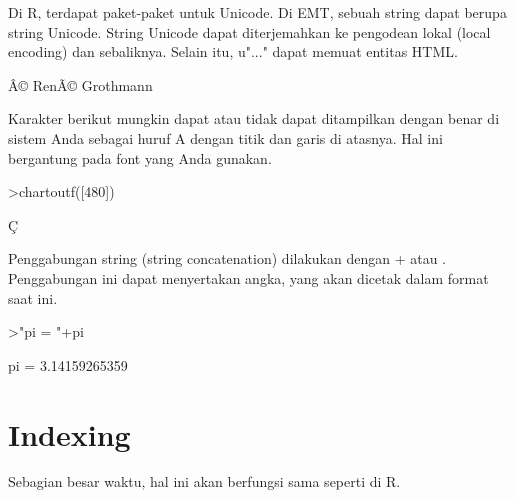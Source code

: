 \documentclass{article}
\newenvironment{eulernotebook}{\par}{\par}
\newcommand{\eulerheading}[1]{\section{#1}}
\newenvironment{eulercomment}{\par\medskip}{\par\medskip}
\begin{document}
\begin{eulernotebook}
\begin{eulercomment}
\begin{eulercomment}
\begin{eulercomment}
\begin{eulercomment}
\begin{eulercomment}
Di R, terdapat paket-paket untuk Unicode. Di EMT, sebuah string dapat
berupa string Unicode. String Unicode dapat diterjemahkan ke pengodean
lokal (local encoding) dan sebaliknya. Selain itu, u"..." dapat memuat
entitas HTML.
\end{eulercomment}
\begin{euleroutput}
  Â© RenÃ© Grothmann
\end{euleroutput}
\begin{eulercomment}
Karakter berikut mungkin dapat atau tidak dapat ditampilkan dengan
benar di sistem Anda sebagai huruf A dengan titik dan garis di
atasnya. Hal ini bergantung pada font yang Anda gunakan.
\end{eulercomment}
\begin{eulerprompt}
>chartoutf([480])
\end{eulerprompt}
\begin{euleroutput}
  Ç 
\end{euleroutput}
\begin{eulercomment}
Penggabungan string (string concatenation) dilakukan dengan + atau \textbar{}.
Penggabungan ini dapat menyertakan angka, yang akan dicetak dalam
format saat ini.
\end{eulercomment}
\begin{eulerprompt}
>"pi = "+pi
\end{eulerprompt}
\begin{euleroutput}
  pi = 3.14159265359
\end{euleroutput}
\eulerheading{Indexing}
\begin{eulercomment}
Sebagian besar waktu, hal ini akan berfungsi sama seperti di R.


\end{eulercomment}
\end{eulercomment}
\end{eulercomment}
\end{eulercomment}
\end{eulercomment}
\end{eulernotebook}
\end{document}
